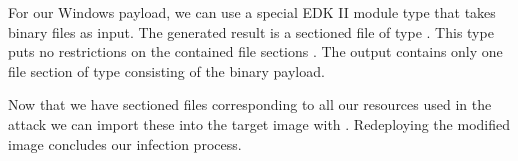 For our Windows payload, we can use a special \ac{EDK} II module type that takes binary files as input.
The generated result is a sectioned file of type .
This type puts no restrictions on the contained file sections \cite[Vol. 3, 2.1.4.1.7]{pi-spec}.
The output contains only one file section of type  consisting of the binary payload.

Now that we have sectioned files corresponding to all our resources used in the attack we can import these into the target image with .
Redeploying the modified image concludes our infection process.

\clearpage
